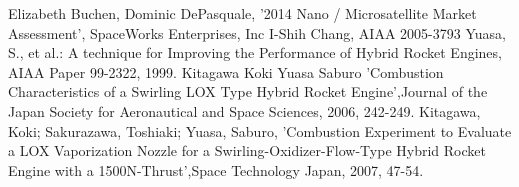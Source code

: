 \begin{thebibliography}{99}
 Elizabeth Buchen, Dominic DePasquale, '2014 Nano / Microsatellite Market Assessment', SpaceWorks Enterprises, Inc
 I-Shih Chang, AIAA 2005-3793
 Yuasa, S., et al.: A technique for Improving the Performance of Hybrid Rocket Engines, AIAA Paper 99-2322, 1999.
 Kitagawa Koki Yuasa Saburo 'Combustion Characteristics of a Swirling LOX Type Hybrid Rocket Engine',Journal of the Japan Society for Aeronautical and Space Sciences, 2006, 242-249.
 Kitagawa, Koki; Sakurazawa, Toshiaki; Yuasa, Saburo, 'Combustion Experiment to Evaluate a LOX Vaporization Nozzle for a Swirling-Oxidizer-Flow-Type Hybrid Rocket Engine with a 1500N-Thrust',Space Technology Japan, 2007, 47-54.
\end{thebibliography}
